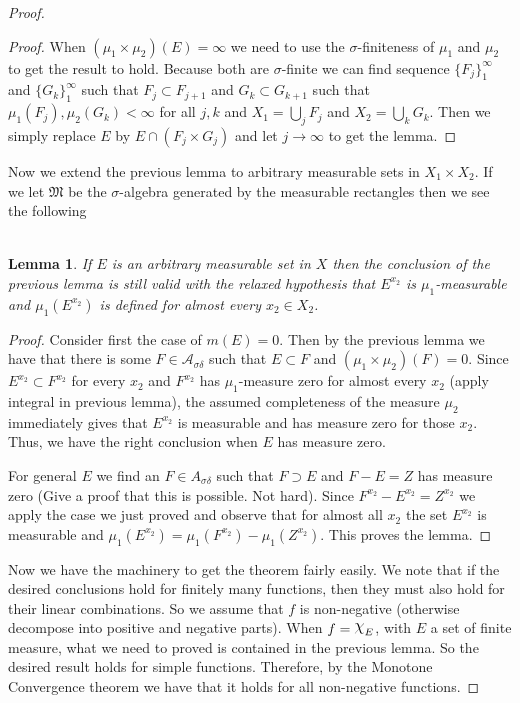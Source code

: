 \documentclass{article}
\DeclareMathOperator{\capchi}{\raisebox{2pt}{$\mathlarger{\mathlarger{\chi}}$}}
\newtheorem*{lem}{\\ Lemma}
\begin{document}
\begin{proof}
\begin{proof}
    When $(\mu_1\times\mu_2)(E) = \infty$ we need to use the
    $\sigma$-finiteness of $\mu_1$ and $\mu_2$ to get the result to
    hold.  Because both are $\sigma$-finite we can find sequence
    $\{F_j\}_1^\infty$ and $\{G_k\}_1^\infty$ such that $F_j \subset
    F_{j+1}$ and $G_k \subset G_{k+1}$ such that $\mu_1(F_j),
    \mu_2(G_k) < \infty$ for all $j,k$ and $X_1 = \bigcup_j F_j$ and
    $X_2 = \bigcup_k G_k$. Then we simply replace $E$ by $E \cap (F_j
    \times G_j)$ and let $j\to\infty$ to get the lemma.
  \end{proof}

  Now we extend the previous lemma to arbitrary measurable sets in
  $X_1\times X_2$. If we let $\mathfrak{M}$ be the $\sigma$-algebra
  generated by the measurable rectangles then we see the following

  \begin{lem}
    If $E$ is an arbitrary measurable set in $X$ then the conclusion
    of the previous lemma is still valid with the relaxed hypothesis
    that $E^{x_2}$ is $\mu_1$-measurable and $\mu_1(E^{x_2})$ is
    defined for almost every $x_2 \in X_2$.
  \end{lem}
  \begin{proof}
    Consider first the case of $m(E) = 0$. Then by the previous lemma
    we have that there is some $F \in \mathcal{A}_{\sigma\delta}$ such
    that $E \subset F$ and $(\mu_1 \times \mu_2)(F) = 0$. Since
    $E^{x_2} \subset F^{x_2}$ for every $x_2$ and $F^{x_2}$ has
    $\mu_1$-measure zero for almost every $x_2$ (apply integral in
    previous lemma), the assumed completeness of the measure $\mu_2$
    immediately gives that $E^{x_2}$ is measurable and has measure
    zero for those $x_2$. Thus, we have the right conclusion when $E$
    has measure zero.

    For general $E$ we find an $F \in A_{\sigma\delta}$ such that $F
    \supset E$ and $F- E = Z$ has measure zero (Give a proof that this
    is possible. Not hard). Since $F^{x_2} - E^{x_2} = Z^{x_2}$ we
    apply the case we just proved and observe that for almost all
    $x_2$ the set $E^{x_2}$ is measurable and $\mu_1(E^{x_2}) =
    \mu_1(F^{x_2}) - \mu_1(Z^{x_2})$. This proves the lemma.
  \end{proof}

  Now we have the machinery to get the theorem fairly easily. We note
  that if the desired conclusions hold for finitely many functions,
  then they must also hold for their linear combinations. So we assume
  that $f$ is non-negative (otherwise decompose into positive and
  negative parts). When $f = \capchi_E$, with $E$ a set of finite
  measure, what we need to proved is contained in the previous
  lemma. So the desired result holds for simple functions. Therefore,
  by the Monotone Convergence theorem we have that it holds for all
  non-negative functions.
\end{proof}
\end{document}
